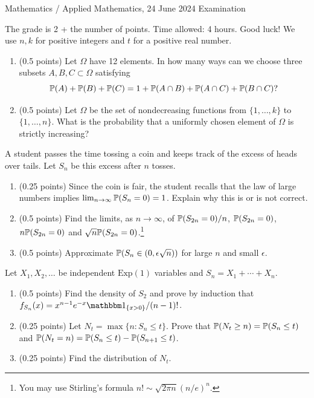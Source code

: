 \documentclass[a4paper]{report}
\begin{document}
\noindent Mathematics / Applied Mathematics, 24 June 2024 \hfill Examination
\hrulefill
\begin{it}The grade is 2 + the number of points. Time allowed: 4 hours. Good luck! We use $n,k$ for positive integers and $t$ for a positive real number.\end{it}
\begin{problem}
\begin{enumerate}
\item (0.5 points) Let $\Omega$ have 12 elements. In how many ways can we choose three subsets $A,B,C\subset\Omega$ satisfying
\[\P(A)+\P(B)+\P(C)=1+\P(A\cap B)+\P(A\cap C)+\P(B\cap C)?\]
\item (0.5 points) Let $\Omega$ be the set of nondecreasing functions from $\{1,\ldots,k\}$ to $\{1,\ldots,n\}$. What is the probability that a uniformly chosen element of $\Omega$ is strictly increasing?
\end{enumerate}
\end{problem}
\begin{problem}
A student passes the time tossing a coin and keeps track of the excess of heads over tails. Let $S_n$ be this excess after $n$ tosses.
\begin{enumerate}
\item (0.25 points) Since the coin is fair, the student recalls that the law of large numbers implies $\lim_{n\to\infty}\P(S_n=0)=1$. Explain why this is or is not correct.
\item (0.5 points) Find the limits, as $n\to\infty$, of $\P(S_{2n}=0)/n$, $\P(S_{2n}=0)$, $n\P(S_{2n}=0)$ and $\sqrt n\P(S_{2n}=0)$.\footnote{You may use Stirling's formula $n!\sim\sqrt{2\pi n}(n/e)^n$.}
\item (0.5 points) Approximate $\P(S_n\in(0,\epsilon\sqrt n))$ for large $n$ and small $\epsilon$.
\end{enumerate}
\end{problem}
\begin{problem}
Let $X_1,X_2,\ldots$ be independent $\mathrm{Exp}(1)$ variables and $S_n=X_1+\cdots+X_n$.
\begin{enumerate}
\item (0.5 points) Find the density of $S_2$ and prove by induction that
$f_{S_n}(x)=x^{n-1}e^{-x}\mathbbm1_{\{x>0\}}/(n-1)!$.
\item (0.25 points) Let $N_t=\max\{n:S_n\leq t\}$. Prove that $\P(N_t\geq n)=\P(S_n\leq t)$ and $\P(N_t=n)=\P(S_n\leq t)-\P(S_{n+1}\leq t)$.
\item (0.25 points) Find the distribution of $N_t$.
\end{enumerate}
\end{problem}
\end{document}
